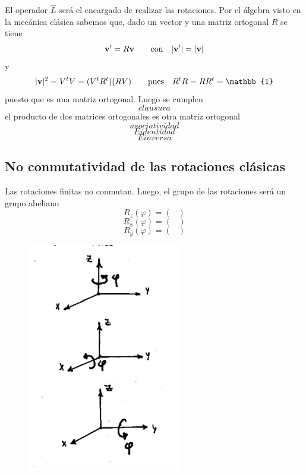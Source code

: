 \documentclass[10pt,oneside]{CBFT_book}
\begin{document}
El operador $\hat{L}$ será el encargado de realizar las rotaciones. Por el álgebra visto en la mecánica 
clásica sabemos que, dado un vector  y una matriz ortogonal $R$ se tiene
\[
	\vb{v}' = R \vb{v} \qquad \text{con} \quad |\vb{v}'|=|\vb{v}|
\]
y 
\[
	|\vb{v}|^2 = V^t V = (V^t R^t) (R V) \qquad \text{pues} \quad R^tR=RR^t = \mathbb{1}
\]
puesto que es una matriz ortogonal. Luego se cumplen 
\[
	clausura	
\]
el producto de dos matrices ortogonales es otra matriz ortogonal
\[
	asociatividad
\]
\[
	E identidad
\]
\[
	E inversa
\]

\subsection{No conmutatividad de las rotaciones clásicas}

Las rotaciones finitas no conmutan. Luego, el grupo de las rotaciones será un grupo abeliano
\[
	R_z(\varphi) = \begin{pmatrix}
	 \\
	\end{pmatrix}
\]
\[
	R_x(\varphi) = \begin{pmatrix}
	 \\
	\end{pmatrix}
\]
\[
	R_y(\varphi) = \begin{pmatrix}
	 \\
	\end{pmatrix}
\]

\begin{figure}[htb]
	\begin{center}
	\includegraphics[width=0.6\textwidth]{images/teo2_10.pdf}
	\end{center}
	\caption{}
\end{figure} 
\end{document}
